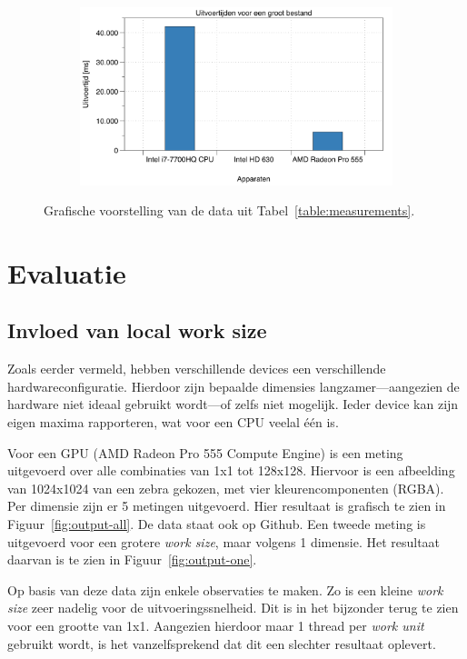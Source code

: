\documentclass[twocolumn, a4paper]{article}
\begin{document}
\begin{figure}
    \begin{subfigure}{0.48\textwidth}
        \includegraphics[width=\textwidth]{data/groot.png}
    \end{subfigure}
    \caption{Grafische voorstelling van de data uit Tabel~\ref{table:measurements}.}\label{fig:images}
\end{figure}

\newpage

\section{Evaluatie}

\subsection{Invloed van local work size}
Zoals eerder vermeld, hebben verschillende devices een verschillende hardwareconfiguratie. Hierdoor zijn bepaalde dimensies langzamer---aangezien de hardware niet ideaal gebruikt wordt---of zelfs niet mogelijk. Ieder device kan zijn eigen maxima rapporteren, wat voor een CPU veelal één is.

Voor een GPU (AMD Radeon Pro 555 Compute Engine) is een meting uitgevoerd over alle combinaties van 1x1 tot 128x128. Hiervoor is een afbeelding van 1024x1024 van een zebra gekozen, met vier kleurencomponenten (RGBA). Per dimensie zijn er 5 metingen uitgevoerd. Hier resultaat is grafisch te zien in Figuur~\ref{fig:output-all}. De data staat ook op Github. Een tweede meting is uitgevoerd voor een grotere \emph{work size}, maar volgens 1 dimensie. Het resultaat daarvan is te zien in Figuur~\ref{fig:output-one}.



Op basis van deze data zijn enkele observaties te maken. Zo is een kleine \emph{work size} zeer nadelig voor de uitvoeringssnelheid. Dit is in het bijzonder terug te zien voor een grootte van 1x1. Aangezien hierdoor maar 1 thread per \emph{work unit} gebruikt wordt, is het vanzelfsprekend dat dit een slechter resultaat oplevert.
\end{document}
